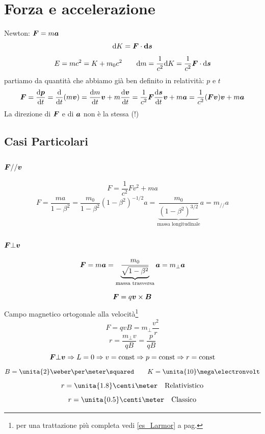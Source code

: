 \section{Forza e accelerazione}
Newton: $\boldsymbol{F}=m\boldsymbol{a}$
$$\mathrm{d} K=\boldsymbol{F}\cdot\boldsymbol{ \mathrm{d} s}$$
$$E=mc^2=K+m_0c^2\qquad \mathrm{d} m=\frac{1}{c^2}\mathrm{d} K=\frac{1}{c^2}\boldsymbol{F}\cdot \mathrm{d} \boldsymbol{s}$$
partiamo da quantità che abbiamo già ben definito in relatività: $p$ e $t$
$$\boldsymbol{F}=\frac{\mathrm{d} \boldsymbol{p}}{\mathrm{d} t}=\frac{\mathrm{d}}{\mathrm{d} t}(m\boldsymbol{v})=\frac{\mathrm{d} m}{\mathrm{d} t}\boldsymbol{v}+m\frac{\mathrm{d} \boldsymbol{v}}{\mathrm{d} t}=\frac{1}{c^2}\boldsymbol{F}\frac{\mathrm{d} \boldsymbol{s}}{\mathrm{d} t}\boldsymbol{v}+m\boldsymbol{a}=\frac{1}{c^2}(\boldsymbol{F}\boldsymbol{v})\boldsymbol{v}+m\boldsymbol{a}$$
La direzione di $\boldsymbol{F}$ e di $\boldsymbol{a}$ non è la stessa (!)
\subsection{Casi Particolari}
\subsubsection{$\boldsymbol{F} // \boldsymbol{v}$}
$$F=\frac{1}{c^2}Fv^2+ma$$
$$F=\frac{ma}{1-\beta^2}=\frac{m_0}{1-\beta^2}(1-\beta^2)^{-1/2}a=\underbrace{\frac{m_0}{(1-\beta^2)^{3/2}}}_{\text{massa longitudinale}}a=m_{//}a$$
\subsubsection{$\boldsymbol{F}\bot\boldsymbol{v}$}
$$\boldsymbol{F}=m\boldsymbol{a}=\underbrace{\frac{m_0}{\sqrt{1-\beta^2}}}_\text{massa trasversa}\boldsymbol{a}=m_\perp \boldsymbol{a}$$
\begin{Es}
$$\boldsymbol{F}=q\boldsymbol{v}\times\boldsymbol{B}$$
Campo magnetico ortogonale alla velocità\footnote{per una trattazione più completa vedi \ref{es_Larmor} a pag.\@\pageref{es_Larmor}}
$$F=qvB=m_\bot\frac{v^2}{r}$$
$$r=\frac{m_\bot v}{qB}=\frac{p}{qB}$$
$$\boldsymbol{F}\bot \boldsymbol{v}\Rightarrow L=0\Rightarrow v=\text{const}\Rightarrow p=\text{const}\Rightarrow r=\text{const}$$
$$B=\unita{2}\weber\per\meter\squared\qquad K=\unita{10}\mega\electronvolt$$
$$r=\unita{1.8}\centi\meter \quad\text{Relativistico}$$
$$r=\unita{0.5}\centi\meter \quad\text{Classico}$$
\end{Es}


\pagebreak
